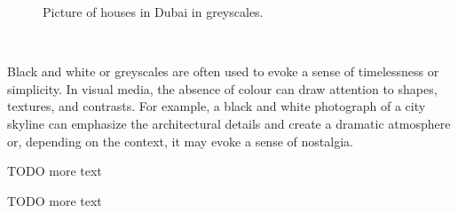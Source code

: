 \documentclass[../MasterThesis.tex]{subfiles}
\begin{document}
\begin{minipage}{0.5\textwidth}
	\begin{figure}[H]
	\begin{center}
		\label{figure:gray}
		\caption[Picture of a houses in Dubai in greyscales.]{Picture of houses in Dubai in greyscales.}
	\end{center}
\end{figure}\hfill
\end{minipage}\begin{minipage}{0.05\textwidth}
	\ 
\end{minipage}\begin{minipage}{0.45\textwidth}
	Black and white or greyscales are often used to evoke a sense of timelessness or simplicity. In visual media, the absence of colour can draw attention to shapes, textures, and contrasts. For example, a black and white photograph of a city skyline can emphasize the architectural details and create a dramatic atmosphere or, depending on the context, it may evoke a sense of nostalgia.
	
	TODO more text
	
	TODO more text
	
\end{minipage}

%














	
	
	
	
\end{document}
